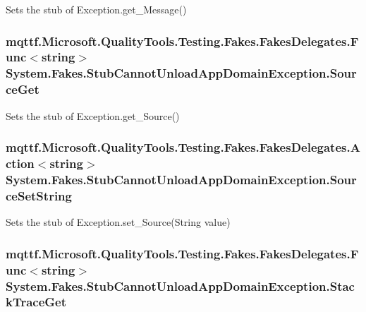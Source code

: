 Sets the stub of Exception.\-get\-\_\-\-Message()

\hypertarget{class_system_1_1_fakes_1_1_stub_cannot_unload_app_domain_exception_a814963d1a9a4d8245c19b6d42dffd60e}{
\subsubsection[{Source\-Get}]{\setlength{\rightskip}{0pt plus 5cm}mqttf.\-Microsoft.\-Quality\-Tools.\-Testing.\-Fakes.\-Fakes\-Delegates.\-Func$<$string$>$ System.\-Fakes.\-Stub\-Cannot\-Unload\-App\-Domain\-Exception.\-Source\-Get}}\label{class_system_1_1_fakes_1_1_stub_cannot_unload_app_domain_exception_a814963d1a9a4d8245c19b6d42dffd60e}


Sets the stub of Exception.\-get\-\_\-\-Source()

\hypertarget{class_system_1_1_fakes_1_1_stub_cannot_unload_app_domain_exception_a41fee911c70badfe3687c97593d18de3}{
\subsubsection[{Source\-Set\-String}]{\setlength{\rightskip}{0pt plus 5cm}mqttf.\-Microsoft.\-Quality\-Tools.\-Testing.\-Fakes.\-Fakes\-Delegates.\-Action$<$string$>$ System.\-Fakes.\-Stub\-Cannot\-Unload\-App\-Domain\-Exception.\-Source\-Set\-String}}\label{class_system_1_1_fakes_1_1_stub_cannot_unload_app_domain_exception_a41fee911c70badfe3687c97593d18de3}


Sets the stub of Exception.\-set\-\_\-\-Source(\-String value)

\hypertarget{class_system_1_1_fakes_1_1_stub_cannot_unload_app_domain_exception_a3584f45685c7ce6588298d4a01709c70}{
\subsubsection[{Stack\-Trace\-Get}]{\setlength{\rightskip}{0pt plus 5cm}mqttf.\-Microsoft.\-Quality\-Tools.\-Testing.\-Fakes.\-Fakes\-Delegates.\-Func$<$string$>$ System.\-Fakes.\-Stub\-Cannot\-Unload\-App\-Domain\-Exception.\-Stack\-Trace\-Get}}\label{class_system_1_1_fakes_1_1_stub_cannot_unload_app_domain_exception_a3584f45685c7ce6588298d4a01709c70}



